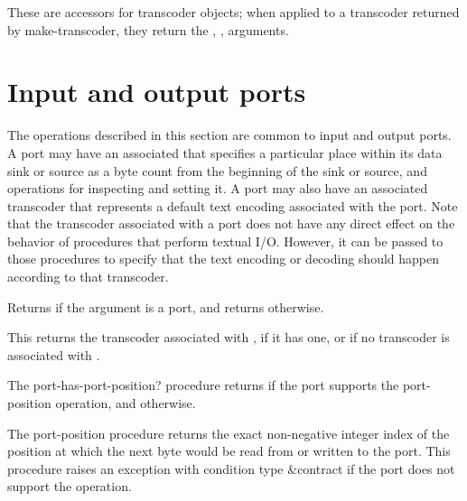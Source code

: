 \begin{entry}{%
}

These are accessors for transcoder objects; when applied to a
transcoder returned by {\cf make-transcoder}, they return the
, ,  arguments.
\end{entry}

\section{Input and output ports}

The operations described in this section are common to input and
output ports.  A port may have an associated  that
specifies a particular place within its data sink or source as a byte
count from the beginning of the sink or source, and operations for
inspecting and setting it.  A port may also have an associated
transcoder that represents a default text encoding associated with the
port.  Note that the transcoder associated with a port does not have
any direct effect on the behavior of procedures that perform
textual I/O.  However,
it can be passed to those procedures to specify that the text encoding
or decoding should happen according to that transcoder.

\begin{entry}{%
}
   
Returns \schtrue{} if the argument is a port, and returns \schfalse{}
otherwise.
\end{entry}

\begin{entry}{%
}

This returns the transcoder associated with , if it has one,
or \schfalse{} if no transcoder is associated with .
\end{entry}

\begin{entry}{%
}

The {\cf port-has-port-position?} procedure returns \schtrue{} if the
port supports the {\cf port-position} operation, and \schfalse{}
otherwise.

The {\cf port-position} procedure
returns the exact non-negative integer index of the position at which the
next byte would be read from or written to the port.
This procedure raises an exception with condition type {\cf\&contract}
if the port does not support the operation.
\end{entry}   

